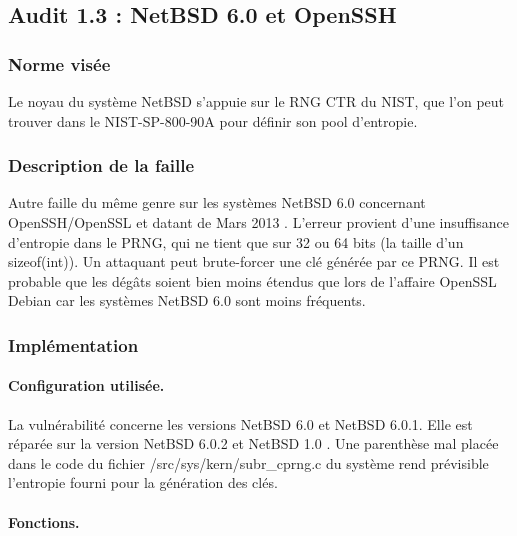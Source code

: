 			
	\subsection{Audit 1.3 : NetBSD 6.0 et OpenSSH}
		\subsubsection{Norme visée}
		
			Le noyau du système NetBSD s'appuie sur le RNG CTR du NIST, que
			l'on peut trouver dans le NIST-SP-800-90A \cite{nist800-90A} pour
			définir son pool d'entropie.	
		
		\subsubsection{Description de la faille}
		
			Autre faille du même genre sur les systèmes NetBSD 6.0 
			concernant OpenSSH/OpenSSL et datant de Mars 2013
			\cite{alerteBSD2013} \cite{failleNetBSDPatrick}. 
			L'erreur provient d'une insuffisance d'entropie dans le PRNG,
			qui ne tient que sur 32 ou 64 bits (la taille d'un sizeof(int)).
			Un attaquant peut brute-forcer une clé générée par ce PRNG.
			Il est probable que les dégâts soient bien moins étendus que 
			lors de l'affaire OpenSSL  Debian car les systèmes 
			NetBSD 6.0 sont moins fréquents.\\
			
		\subsubsection{Implémentation}
			
			\paragraph{Configuration utilisée.\\} 
			
			La vulnérabilité concerne les versions NetBSD 6.0 et NetBSD 6.0.1.
			Elle est réparée sur la version NetBSD 6.0.2 et NetBSD 1.0 
			\cite{diffNetBSD}.	Une parenthèse mal placée dans le code du fichier 
			/src/sys/kern/subr\_cprng.c du système rend prévisible l'entropie
			fourni pour la génération des clés.\\
			
			\paragraph{Fonctions.\\} 
			
